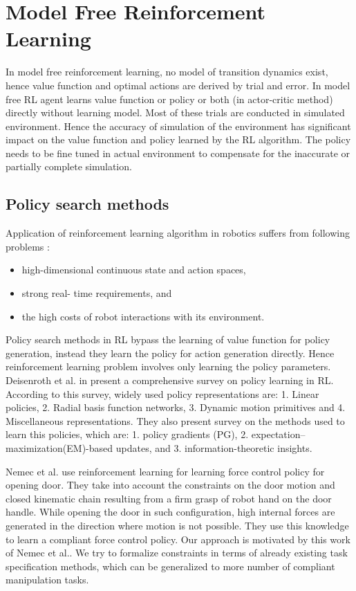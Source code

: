 \documentclass[thesis]{mas_proposal}
\begin{document}
\section{Model Free Reinforcement Learning}

In model free reinforcement learning, no model of transition dynamics exist, hence value function and optimal actions are derived by trial and error\cite{polydoros2017survey}. In model free RL agent learns value function or policy or both (in actor-critic method) directly without learning model. Most of these trials are conducted in simulated environment. Hence the accuracy of simulation of the environment has significant impact on the value function and policy learned by the RL algorithm. The policy needs to be fine tuned in actual environment to compensate for the inaccurate or partially complete simulation.

\subsection{Policy search methods}
Application of reinforcement learning algorithm in robotics suffers from following problems \cite{deisenroth2013survey}:
\begin{itemize}
	\item high-dimensional continuous state and action spaces, 
	\item strong real- time requirements, and 
	\item the high costs of robot interactions with its environment.
\end{itemize} 
Policy search methods in RL bypass the learning of value function for policy generation, instead they learn the policy for action generation directly. Hence reinforcement learning problem involves only learning the policy parameters. Deisenroth et al. in \cite{deisenroth2013survey} present a comprehensive survey on policy learning in RL. According to this survey, widely used policy representations are: 1. Linear policies, 2. Radial basis function networks, 3. Dynamic motion primitives and 4. Miscellaneous representations. They also present survey on the methods used to learn this policies, which are: 1. policy gradients (PG), 2. expectation–maximization(EM)-based updates, and 3. information-theoretic insights.

Nemec et al. use reinforcement learning for learning force control policy for opening door\cite{nemec2017door}. They take into account the constraints on the door motion and closed kinematic chain resulting from a firm grasp of robot hand on the door handle. While opening the door in such configuration, high internal forces are generated in the direction where motion is not possible. They use this knowledge to learn a compliant force control policy. Our approach is motivated by this work of Nemec et al.\cite{nemec2017door}. We try to formalize constraints in terms of already existing task specification methods, which can be generalized to more number of compliant manipulation tasks. 
\end{document}
